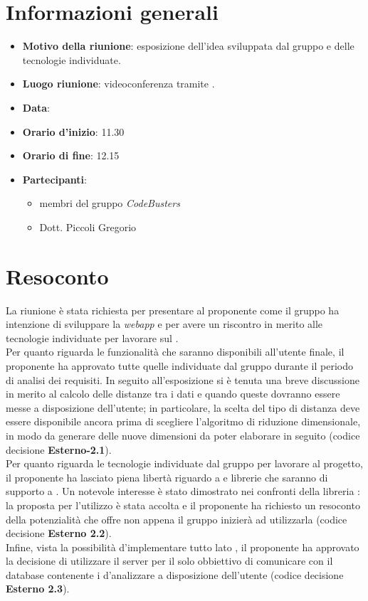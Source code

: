 \section{Informazioni generali}
\begin{itemize}
\item \textbf{Motivo della riunione}: esposizione dell'idea sviluppata dal gruppo e delle tecnologie individuate.
\item \textbf{Luogo riunione}: videoconferenza tramite .
\item \textbf{Data}: \Data{}
\item \textbf{Orario d'inizio}: 11.30 
\item \textbf{Orario di fine}: 12.15 
\item \textbf{Partecipanti}:
	\begin{itemize}
	\item membri del gruppo \textit{CodeBusters}
	\item Dott. Piccoli Gregorio
	\end{itemize}
\end{itemize}

\section{Resoconto}
La riunione è stata richiesta per presentare al proponente come il gruppo ha intenzione di sviluppare la \textit{webapp}\glo{} e per avere un riscontro in merito alle tecnologie individuate per lavorare sul . \\
Per quanto riguarda le funzionalità che saranno disponibili all'utente finale, il proponente ha approvato tutte quelle individuate dal gruppo durante il periodo di analisi dei requisiti. In seguito all'esposizione si è tenuta una breve discussione in merito al calcolo delle distanze tra i dati e quando queste dovranno essere messe a disposizione dell'utente; in particolare, la scelta del tipo di distanza deve essere disponibile ancora prima di scegliere l'algoritmo di riduzione dimensionale, in modo da generare delle nuove dimensioni da poter elaborare in seguito (codice decisione \textbf{Esterno-2.1}). \\
Per quanto riguarda le tecnologie individuate dal gruppo per lavorare al progetto, il proponente ha lasciato piena libertà riguardo a  e librerie che saranno di supporto a . Un notevole interesse è stato dimostrato nei confronti della libreria : la proposta per l'utilizzo è stata accolta e il proponente ha richiesto un resoconto della potenzialità che offre non appena il gruppo inizierà ad utilizzarla (codice decisione \textbf{Esterno 2.2}). \\
Infine, vista la possibilità d'implementare tutto lato , il proponente ha approvato la decisione di utilizzare il server per il solo obbiettivo di comunicare con il database contenente i  d'analizzare a disposizione dell'utente (codice decisione \textbf{Esterno 2.3}).